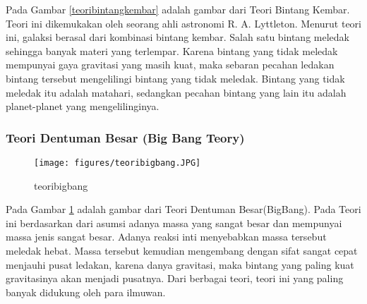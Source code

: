 Pada Gambar \ref{teoribintangkembar} adalah gambar dari Teori Bintang Kembar.
Teori ini dikemukakan oleh seorang ahli astronomi R. A. Lyttleton. Menurut teori ini, galaksi berasal dari kombinasi bintang kembar. Salah satu bintang meledak sehingga banyak materi yang terlempar. Karena bintang yang tidak meledak mempunyai gaya gravitasi yang masih kuat, maka sebaran pecahan ledakan bintang tersebut mengelilingi bintang yang tidak meledak. Bintang yang tidak meledak itu adalah matahari, sedangkan pecahan bintang yang lain itu adalah planet-planet yang mengelilinginya.

\subsubsection{Teori Dentuman Besar (Big Bang Teory)}
\begin{figure} [ht]
	\centerline{\texttt{[image: figures/teoribigbang.JPG]}}
	\caption{teoribigbang}
	\label{teoribigbang}
	\end{figure}
	
Pada Gambar \ref{teoribigbang} adalah gambar dari Teori Dentuman Besar(BigBang).
Pada Teori ini berdasarkan dari asumsi adanya massa yang sangat besar dan mempunyai massa jenis sangat besar. Adanya reaksi inti menyebabkan massa tersebut meledak hebat. Massa tersebut kemudian mengembang dengan sifat sangat cepat menjauhi pusat ledakan, karena danya gravitasi, maka bintang yang paling kuat gravitasinya akan menjadi pusatnya.
Dari berbagai teori, teori ini yang paling banyak didukung oleh para ilmuwan.

